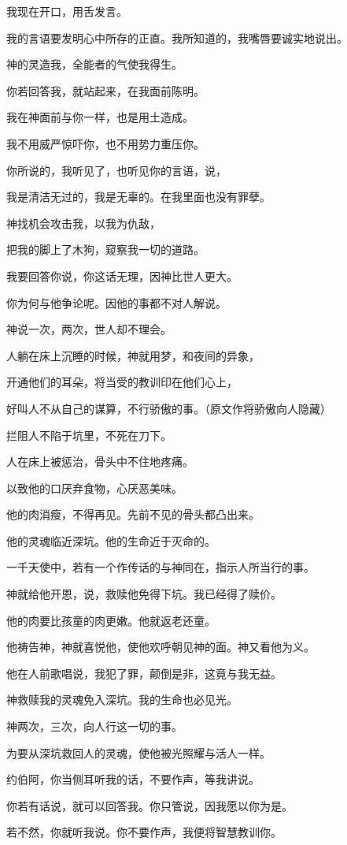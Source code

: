 \documentclass[12pt,oneside]{book}
\begin{document}
我现在开口，用舌发言。

我的言语要发明心中所存的正直。我所知道的，我嘴唇要诚实地说出。

神的灵造我，全能者的气使我得生。

你若回答我，就站起来，在我面前陈明。

我在神面前与你一样，也是用土造成。

我不用威严惊吓你，也不用势力重压你。

你所说的，我听见了，也听见你的言语，说，

我是清洁无过的，我是无辜的。在我里面也没有罪孽。

神找机会攻击我，以我为仇敌，

把我的脚上了木狗，窥察我一切的道路。

我要回答你说，你这话无理，因神比世人更大。

你为何与他争论呢。因他的事都不对人解说。

神说一次，两次，世人却不理会。

人躺在床上沉睡的时候，神就用梦，和夜间的异象，

开通他们的耳朵，将当受的教训印在他们心上，

好叫人不从自己的谋算，不行骄傲的事。（原文作将骄傲向人隐藏）

拦阻人不陷于坑里，不死在刀下。

人在床上被惩治，骨头中不住地疼痛。

以致他的口厌弃食物，心厌恶美味。

他的肉消瘦，不得再见。先前不见的骨头都凸出来。

他的灵魂临近深坑。他的生命近于灭命的。

一千天使中，若有一个作传话的与神同在，指示人所当行的事。

神就给他开恩，说，救赎他免得下坑。我已经得了赎价。

他的肉要比孩童的肉更嫩。他就返老还童。

他祷告神，神就喜悦他，使他欢呼朝见神的面。神又看他为义。

他在人前歌唱说，我犯了罪，颠倒是非，这竟与我无益。

神救赎我的灵魂免入深坑。我的生命也必见光。

神两次，三次，向人行这一切的事。

为要从深坑救回人的灵魂，使他被光照耀与活人一样。

约伯阿，你当侧耳听我的话，不要作声，等我讲说。

你若有话说，就可以回答我。你只管说，因我愿以你为是。

若不然，你就听我说。你不要作声，我便将智慧教训你。
\end{document}
